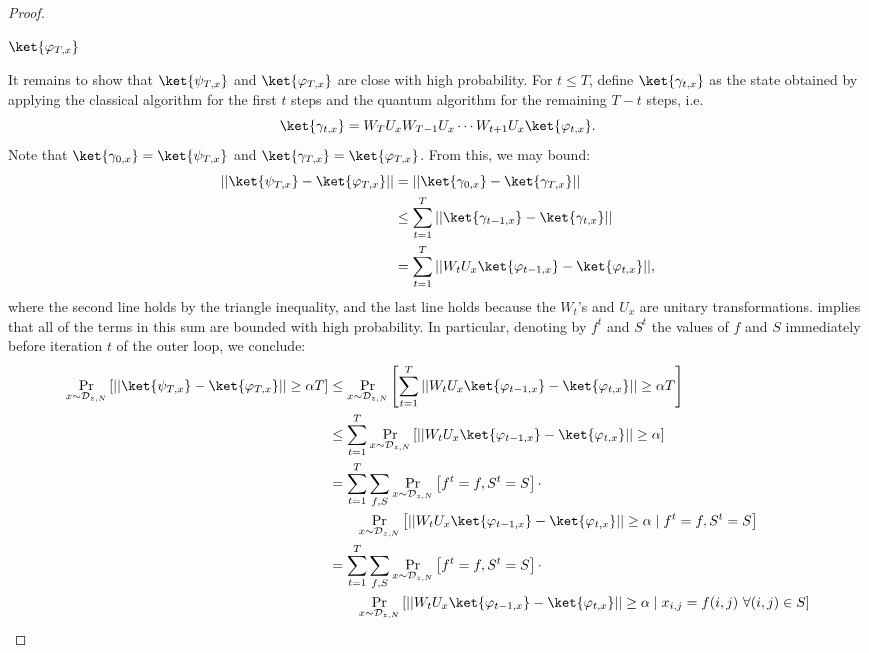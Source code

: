 \documentclass[11pt]{article}%
\begin{document}
\begin{proof}
\begin{algorithm}
\Return $\ket{\varphi_{T,x}}$
\end{algorithm}

It remains to show that $\ket{\psi_{T,x}}$ and $\ket{\varphi_{T,x}}$ are close with high probability. For $t \le T$, define $\ket{\gamma_{t,x}}$ as the state obtained by applying the classical algorithm for the first $t$ steps and the quantum algorithm for the remaining $T - t$ steps, i.e.
\[
\ket{\gamma_{t,x}} = W_TU_xW_{T-1}U_x\cdots W_{t+1}U_x\ket{\varphi_{t,x}}.
\]
Note that $\ket{\gamma_{0,x}} = \ket{\psi_{T,x}}$ and $\ket{\gamma_{T,x}} = \ket{\varphi_{T,x}}$. From this, we may bound:
\begin{align}
||\ket{\psi_{T,x}} - \ket{\varphi_{T,x}}|| &= ||\ket{\gamma_{0,x}} - \ket{\gamma_{T,x}}||\nonumber\\
&\le \sum_{t=1}^T ||\ket{\gamma_{t-1,x}} - \ket{\gamma_{t,x}}||\nonumber\\
&= \sum_{t=1}^T ||W_tU_x\ket{\varphi_{t-1,x}} - \ket{\varphi_{t,x}}||\label{eq:sparse_aa_hybrid},
\end{align}
where the second line holds by the triangle inequality, and the last line holds because the $W_t$'s and $U_x$ are unitary transformations.  implies that all of the terms in this sum are bounded with high probability. In particular, denoting by $f^t$ and $S^t$ the values of $f$ and $S$ immediately before iteration $t$ of the outer loop,
we conclude:
\begin{align*}
\Pr_{x \sim \mathcal{D}_{z,N}}\left[||\ket{\psi_{T,x}} - \ket{\varphi_{T,x}}|| \ge \alpha T\right] &\le \Pr_{x \sim \mathcal{D}_{z,N}}\left[\sum_{t=1}^T ||W_tU_x\ket{\varphi_{t-1,x}} - \ket{\varphi_{t,x}}|| \ge \alpha T\right]\\
&\le \sum_{t=1}^T \Pr_{x \sim \mathcal{D}_{z,N}}\left[||W_tU_x\ket{\varphi_{t-1,x}} - \ket{\varphi_{t,x}}|| \ge \alpha\right]\\
&= \sum_{t=1}^T \sum_{f,S}\Pr_{x \sim \mathcal{D}_{z,N}}\left[f^t = f, S^t = S\right] \cdot \\
&\qquad\Pr_{x \sim \mathcal{D}_{z,N}}\left[||W_tU_x\ket{\varphi_{t-1,x}} - \ket{\varphi_{t,x}}|| \ge \alpha \mid f^t = f, S^t = S\right]\\
&= \sum_{t=1}^T \sum_{f,S}\Pr_{x \sim \mathcal{D}_{z,N}}\left[f^t = f, S^t = S\right] \cdot \\
&\qquad\Pr_{x \sim \mathcal{D}_{z,N}}\left[||W_tU_x\ket{\varphi_{t-1,x}} - \ket{\varphi_{t,x}}|| \ge \alpha \mid x_{i,j} = f(i,j)\ \forall (i, j) \in S\right]\\

\end{align*}
\end{proof}
\end{document}
